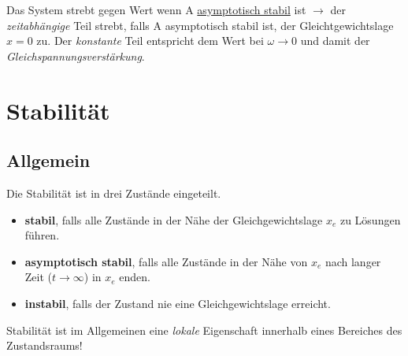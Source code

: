 \documentclass[
  10pt,
  a4paper,
  twocolumn]{article}
\providecommand{\tightlist}{%
  \setlength{\itemsep}{0pt}\setlength{\parskip}{0pt}}\usepackage{longtable,booktabs,array}
\numberwithin{equation}{section}
\begin{document}
Das System strebt gegen Wert wenn A \ul{asymptotisch stabil} ist
\(\rightarrow\) der \emph{zeitabhängige} Teil strebt, falls A
asymptotisch stabil ist, der Gleichtgewichtslage \(x=0\) zu. Der
\emph{konstante} Teil entspricht dem Wert bei \(\omega\rightarrow 0\)
und damit der \emph{Gleichspannungsverstärkung}.

\hypertarget{stabilituxe4t}{%
\section{Stabilität}\label{stabilituxe4t}}

\hypertarget{allgemein}{%
\subsection{Allgemein}\label{allgemein}}

Die Stabilität ist in drei Zustände eingeteilt.

\begin{itemize}
\tightlist
\item
  \textbf{stabil}, falls alle Zustände in der Nähe der
  Gleichgewichtslage \(x_e\) zu Lösungen führen.
\item
  \textbf{asymptotisch stabil}, falls alle Zustände in der Nähe von
  \(x_e\) nach langer Zeit (\(t \rightarrow \infty\)) in \(x_e\) enden.
\item
  \textbf{instabil}, falls der Zustand nie eine Gleichgewichtslage
  erreicht.
\end{itemize}

Stabilität ist im Allgemeinen eine \emph{lokale} Eigenschaft innerhalb
eines Bereiches des Zustandsraums!
\end{document}
